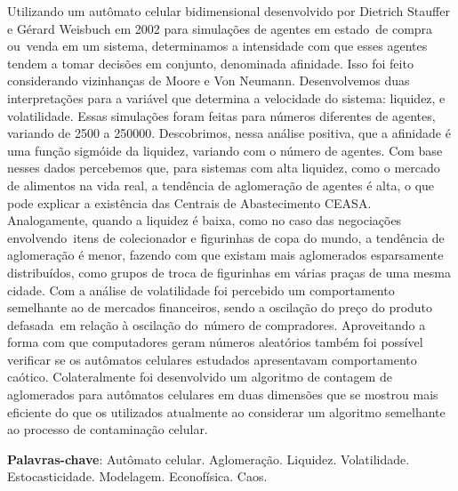 \documentclass[
	12pt,				%
	openright,			%
	twoside,			%
	a4paper,			%
	english,			%
	french,				%
	spanish,			%
	brazil				%
	]{abntex2}
\begin{document}

\setlength{\absparsep}{18pt} %
\begin{resumo}
  Utilizando um autômato celular bidimensional desenvolvido por Dietrich Stauffer e Gérard Weisbuch em 2002 para simulações de agentes em estado de compra ou venda em um sistema, determinamos a intensidade com que esses agentes tendem a tomar decisões em conjunto, denominada afinidade. Isso foi feito considerando vizinhanças de Moore e Von Neumann. Desenvolvemos duas interpretações para a variável que determina a velocidade do sistema: liquidez, e volatilidade. Essas simulações foram feitas para números diferentes de agentes, variando de 2500 a 250000. Descobrimos, nessa análise positiva, que a afinidade é uma função sigmóide da liquidez, variando com o número de agentes. Com base nesses dados percebemos que, para sistemas com alta liquidez, como o mercado de alimentos na vida real, a tendência de aglomeração de agentes é alta, o que pode explicar a existência das Centrais de Abastecimento CEASA. Analogamente, quando a liquidez é baixa, como no caso das negociações envolvendo itens de colecionador e figurinhas de copa do mundo, a tendência de aglomeração é menor, fazendo com que existam mais aglomerados esparsamente distribuídos, como grupos de troca de figurinhas em várias praças de uma mesma cidade. Com a análise de volatilidade foi percebido um comportamento semelhante ao de mercados financeiros, sendo a oscilação do preço do produto defasada em relação à oscilação do número de compradores. Aproveitando a forma com que computadores geram números aleatórios também foi possível verificar se os autômatos celulares estudados apresentavam comportamento caótico. Colateralmente foi desenvolvido um algoritmo de contagem de aglomerados para autômatos celulares em duas dimensões que se mostrou mais eficiente do que os utilizados atualmente ao considerar um algoritmo semelhante ao processo de contaminação celular.

 \textbf{Palavras-chave}: Autômato celular. Aglomeração. Liquidez. Volatilidade. Estocasticidade. Modelagem. Econofísica. Caos.
\end{resumo}
\end{document}
